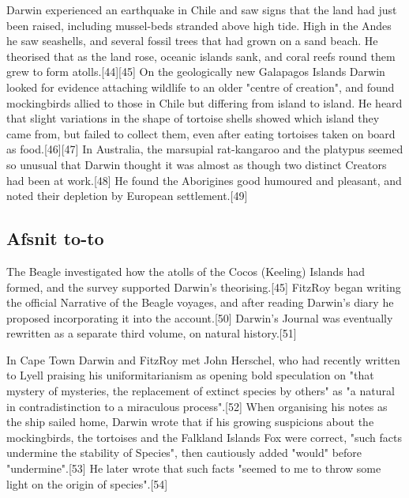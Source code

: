 \documentclass{article}%
\begin{document}
Darwin experienced an earthquake in Chile and saw signs that the land had just been raised, including mussel-beds stranded above high tide. High in the Andes he saw seashells, and several fossil trees that had grown on a sand beach. He theorised that as the land rose, oceanic islands sank, and coral reefs round them grew to form atolls.[44][45]
On the geologically new Galapagos Islands Darwin looked for evidence attaching wildlife to an older "centre of creation", and found mockingbirds allied to those in Chile but differing from island to island. He heard that slight variations in the shape of tortoise shells showed which island they came from, but failed to collect them, even after eating tortoises taken on board as food.[46][47] In Australia, the marsupial rat-kangaroo and the platypus seemed so unusual that Darwin thought it was almost as though two distinct Creators had been at work.[48] He found the Aborigines good humoured and pleasant, and noted their depletion by European settlement.[49]
\subsection{Afsnit to-to}
The Beagle investigated how the atolls of the Cocos (Keeling) Islands had formed, and the survey supported Darwin's theorising.[45] FitzRoy began writing the official Narrative of the Beagle voyages, and after reading Darwin's diary he proposed incorporating it into the account.[50] Darwin's Journal was eventually rewritten as a separate third volume, on natural history.[51]

In Cape Town Darwin and FitzRoy met John Herschel, who had recently written to Lyell praising his uniformitarianism as opening bold speculation on "that mystery of mysteries, the replacement of extinct species by others" as "a natural in contradistinction to a miraculous process".[52] When organising his notes as the ship sailed home, Darwin wrote that if his growing suspicions about the mockingbirds, the tortoises and the Falkland Islands Fox were correct, "such facts undermine the stability of Species", then cautiously added "would" before "undermine".[53] He later wrote that such facts "seemed to me to throw some light on the origin of species".[54]
\end{document}
